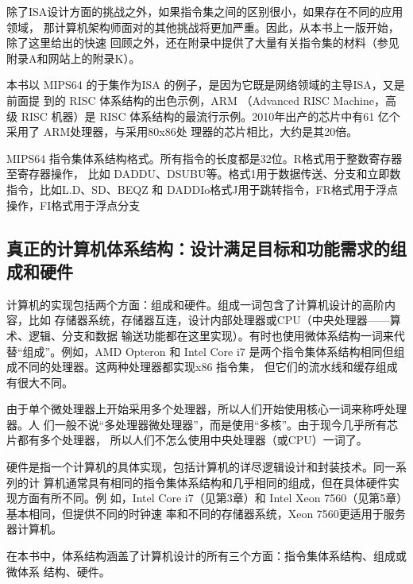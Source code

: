 除了ISA设计方面的挑战之外，如果指令集之间的区别很小，如果存在不同的应用领域，
那计算机架构师面对的其他挑战将更加严重。因此，从本书上一版开始，除了这里给出的快速
回顾之外，还在附录中提供了大量有关指令集的材料（参见附录A和网站上的附录K）。

本书以 MIPS64 的于集作为ISA 的例子，是因为它既是网络领域的主导ISA，又是前面提
到的 RISC 体系结构的出色示例，ARM （Advanced RISC Machine，高级 RISC 机器）是 RISC
体系结构的最流行示例。2010年出产的芯片中有61 亿个采用了 ARM处理器，与采用80x86处
理器的芯片相比，大约是其20倍。

MIPS64 指令集体系结构格式。所有指令的长度都是32位。R格式用于整数寄存器至寄存器操作，
比如 DADDU、DSUBU等。格式1用于数据传送、分支和立即数指令，比如L.D、SD、BEQZ 和
DADDIo格式J用于跳转指令，FR格式用于浮点操作，FI格式用于浮点分支

\subsection{真正的计算机体系结构：设计满足目标和功能需求的组成和硬件}
计算机的实现包括两个方面：组成和硬件。组成一词包含了计算机设计的高阶内容，比如
存储器系统，存储器互连，设计内部处理器或CPU（中央处理器——算术、逻辑、分支和数据
输送功能都在这里实现）。有时也使用微体系结构一词来代替“组成”。例如，AMD Opteron 和
Intel Core i7 是两个指令集体系结构相同但组成不同的处理器。这两种处理器都实现x86 指令集，
但它们的流水线和缓存组成有很大不同。

由于单个微处理器上开始采用多个处理器，所以人们开始使用核心一词来称呼处理器。人
们一般不说“多处理器微处理器”，而是使用“多核”。由于现今几乎所有芯片都有多个处理器，
所以人们不怎么使用中央处理器（或CPU）一词了。

硬件是指一个计算机的具体实现，包括计算机的详尽逻辑设计和封装技术。同一系列的计
算机通常具有相同的指令集体系结构和几乎相同的组成，但在具体硬件实现方面有所不同。例
如，Intel Core i7（见第3章）和 Intel Xeon 7560（见第5章）基本相同，但提供不同的时钟速
率和不同的存储器系统，Xeon 7560更适用于服务器计算机。

在本书中，体系结构涵盖了计算机设计的所有三个方面：指令集体系结构、组成或微体系
结构、硬件。

